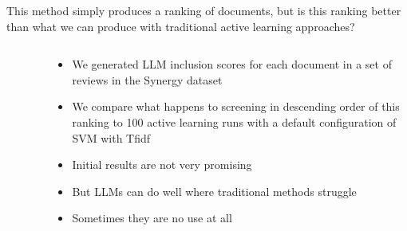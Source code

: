 \documentclass[9pt,aspectratio=169]{beamer}
\begin{document}
\begin{frame}{This method simply produces a ranking of documents, but is this ranking better than what we can produce with traditional active learning approaches?}
\begin{columns}
\begin{column}{0.618\linewidth}
\begin{figure}
			\end{figure}
		\end{column}
		\begin{column}{0.382\linewidth}
			\begin{itemize}
				\item<1-> We generated LLM inclusion scores for each document in a set of reviews in the Synergy dataset
				\item<2-> We compare what happens to screening in descending order of this ranking to 100 active learning runs with a default configuration of SVM with Tfidf
				\item<3-> Initial results are not very promising
				\item<5->But LLMs can do well where traditional methods struggle
				\item<7->Sometimes they are no use at all
			\end{itemize}
		\end{column}
	\end{columns}
	
	
	

\end{frame}
\end{document}
